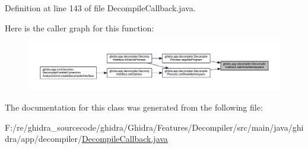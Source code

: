 Definition at line 143 of file Decompile\+Callback.\+java.

Here is the caller graph for this function\+:
\nopagebreak
\begin{figure}[H]
\begin{center}
\leavevmode
\includegraphics[width=350pt]{classghidra_1_1app_1_1decompiler_1_1_decompile_callback_a821d08d61bdfaaf11784912f935f3cc1_icgraph}
\end{center}
\end{figure}


The documentation for this class was generated from the following file\+:\begin{DoxyCompactItemize}
\item 
F\+:/re/ghidra\+\_\+sourcecode/ghidra/\+Ghidra/\+Features/\+Decompiler/src/main/java/ghidra/app/decompiler/\mbox{\hyperlink{_decompile_callback_8java}{Decompile\+Callback.\+java}}\end{DoxyCompactItemize}
